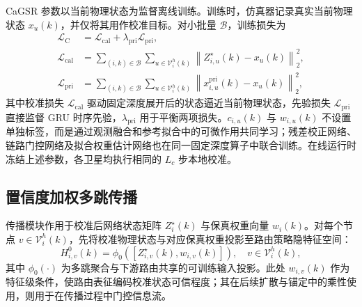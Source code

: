 CaGSR 参数以当前物理状态为监督离线训练。训练时，仿真器记录真实当前物理状态 $x_u(k)$，并仅将其用作校准目标。对小批量 $\mathcal B$，训练损失为
\begin{equation}
\begin{aligned}
\mathcal L_{\mathrm C}
&=
\mathcal L_{\mathrm{cal}}
+
\lambda_{\mathrm{pri}}\mathcal L_{\mathrm{pri}},
\\
\mathcal L_{\mathrm{cal}}
&=
\sum_{(i,k)\in\mathcal B}
\sum_{u\in\mathcal V_i^h(k)}
\left\|
Z_{i,u}^{\star}(k)-x_u(k)
\right\|_2^2,
\\
\mathcal L_{\mathrm{pri}}
&=
\sum_{(i,k)\in\mathcal B}
\sum_{u\in\mathcal V_i^h(k)}
\left\|
x_{i,u}^{\mathrm{pri}}(k)-x_u(k)
\right\|_2^2 ,
\end{aligned}
\label{eq:ch2_cagsr_loss}
\end{equation}
其中校准损失 $\mathcal L_{\mathrm{cal}}$ 驱动固定深度展开后的状态逼近当前物理状态，先验损失 $\mathcal L_{\mathrm{pri}}$ 直接监督 GRU 时序先验，$\lambda_{\mathrm{pri}}$ 用于平衡两项损失。$c_{i,u}(k)$ 与 $w_{i,u}(k)$ 不设置单独标签，而是通过观测融合和参考拟合中的可微作用共同学习；残差校正网络、链路门控网络及拟合权重估计网络也在同一固定深度算子中联合训练。在线运行时冻结上述参数，各卫星均执行相同的 $L_c$ 步本地校准。

\subsection{置信度加权多跳传播}
\label{subsec:ch2_propagation}

传播模块作用于校准后网络状态矩阵 $Z_i^\star(k)$ 与保真权重向量 $w_i(k)$。对每个节点 $v\in\mathcal V_i^h(k)$，先将校准物理状态与对应保真权重投影至路由策略隐特征空间：
\begin{equation}
H_{i,v}^{0}(k)
=
\phi_0
\left(
\left[
Z_{i,v}^{\star}(k),
w_{i,v}(k)
\right]
\right),
\quad
v\in\mathcal V_i^h(k),
\label{eq:ch2_prop_input}
\end{equation}
其中 $\phi_0(\cdot)$ 为多跳聚合与下游路由共享的可训练输入投影。此处 $w_{i,v}(k)$ 作为特征级条件，使路由表征编码校准状态可信程度；其在后续扩散与锚定中的乘性使用，则用于在传播过程中门控信息流。

